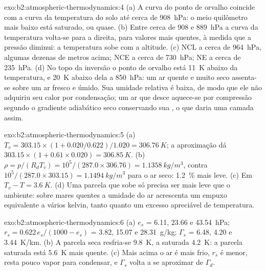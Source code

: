 \begin{solution}{exo:b2:atmospheric-thermodynamics:4}
(a) A curva do ponto de orvalho coincide com a curva da temperatura do solo até cerca de \qty{908}{hPa}:
o meio quilômetro mais baixo está saturado, ou quase. (b) Entre cerca de 908 e \qty{889}{hPa}
a curva da temperatura volta-se para a direita, para valores mais quentes, à medida que a pressão diminui: a
temperatura sobe com a altitude. (c) NCL a cerca de \qty{964}{hPa}, algumas dezenas de metros acima; NCE a
cerca de \qty{730}{hPa}; NE a cerca de \qty{235}{hPa}. (d) No topo da inversão o ponto de orvalho
está \qty{11}{K} abaixo da temperatura, e \qty{20}{K} abaixo dela a \qty{850}{hPa}: um ar quente e muito seco
assenta-se sobre um ar fresco e úmido. Sua umidade relativa é baixa, de modo que ele não adquiriu seu
calor por condensação; um ar que desce aquece-se por compressão segundo o gradiente adiabático seco
conservando sua , o que daria uma camada assim.
\end{solution}

\begin{solution}{exo:b2:atmospheric-thermodynamics:5}
(a) $T_v = 303.15 \times (1 + 0.020/0.622)/1.020 = \qty{306.76}{K}$; a aproximação dá
$303.15 \times (1 + 0.61 \times 0.020) = \qty{306.85}{K}$. (b) $\rho = p/(R_dT_v) = 10^5/(287.0
\times 306.76) = \qty{1.1358}{kg/m^3}$, contra $10^5/(287.0 \times 303.15) =
\qty{1.1494}{kg/m^3}$ para o ar seco: \qty{1.2}{\percent} mais leve. (c) Em $T_v - T =
\qty{3.6}{K}$. (d) Uma parcela que sobe só precisa ser mais leve que o ambiente: sobre mares quentes
a umidade do ar acrescenta um empuxo equivalente a vários kelvin, tanto quanto um excesso
apreciável de temperatura.
\end{solution}

\begin{solution}{exo:b2:atmospheric-thermodynamics:6}
(a) $e_s$ = 6.11, 23.66 e \qty{43.54}{hPa}; $r_s = 0.622\,e_s/(1000 - e_s)$ = 3.82, 15.07 e
\qty{28.31}{g/kg}; $\Gamma_s$ = 6.48, 4.20 e \qty{3.44}{K/km}. (b) A parcela seca resfria-se
\qty{9.8}{K}, a saturada \qty{4.2}{K}: a parcela saturada está \qty{5.6}{K} mais quente.
(c) Mais acima o ar é mais frio, $r_s$ é menor, resta pouco vapor para condensar, e
$\Gamma_s$ volta a se aproximar de $\Gamma_d$.
\end{solution}

